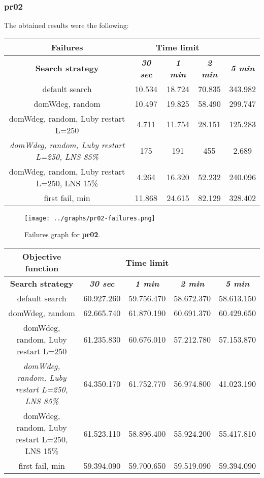 \subsubsection{pr02}
\label{subsubsec:pr02}
The obtained results were the following:
{
\renewcommand{\arraystretch}{2}
\begin{longtable}[h]{| c | c | c | c | c |}
    \hline
    \textbf{Failures} & \multicolumn{3}{c}{Time limit} & \\
    \hline
    \textbf{Search strategy} & \textbf{\textit{30 sec}} & \textbf{\textit{1 min}} & \textbf{\textit{2 min}} & \textbf{\textit{5 min}} \\
    \hline
    \endhead
    default search                                         & 10.534 & 18.724 & 70.835 & 343.982 \\
    \hline
    domWdeg, random                                        & 10.497 & 19.825 & 58.490 & 299.747 \\
    \hline
    domWdeg, random, Luby restart L=250                    &  4.711 & 11.754 & 28.151 & 125.283 \\
    \hline
    \textit{domWdeg, random, Luby restart L=250, LNS 85\%} &   175 &   191 &   455 &   2.689 \\
    \hline
    domWdeg, random, Luby restart L=250, LNS 15\%          &  4.264 & 16.320 & 52.232 & 240.096 \\
    \hline
    first fail, min                                        & 11.868 & 24.615 & 82.129 & 328.402 \\
    \hline
\end{longtable}
}
\begin{figure}[H]
    \centering
    \texttt{[image: ../graphs/pr02-failures.png]}
    \caption{Failures graph for \textbf{pr02}.}
\end{figure}
{
\renewcommand{\arraystretch}{2}
\begin{longtable}[h]{| c | c | c | c | c |}
    \hline
    \textbf{Objective function} & \multicolumn{3}{c}{Time limit} & \\
    \hline
    \textbf{Search strategy} & \textbf{\textit{30 sec}} & \textbf{\textit{1 min}} & \textbf{\textit{2 min}} & \textbf{\textit{5 min}} \\
    \hline
    \endhead
    default search                                         & 60.927.260 & 59.756.470 & 58.672.370 & 58.613.150 \\
    \hline
    domWdeg, random                                        & 62.665.740 & 61.870.190 & 60.691.370 & 60.429.650 \\
    \hline
    domWdeg, random, Luby restart L=250                    & 61.235.830 & 60.676.010 & 57.212.780 & 57.153.870 \\
    \hline
    \textit{domWdeg, random, Luby restart L=250, LNS 85\%} & 64.350.170 & 61.752.770 & 56.974.800 & 41.023.190 \\
    \hline
    domWdeg, random, Luby restart L=250, LNS 15\%          & 61.523.110 & 58.896.400 & 55.924.200 & 55.417.810 \\
    \hline
    first fail, min                                        & 59.394.090 & 59.700.650 & 59.519.090 & 59.394.090 \\
    \hline
\end{longtable}
}
